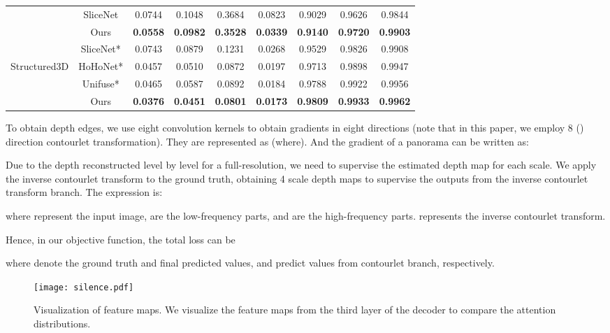 \documentclass[10pt,times,mathptm,psfig,twocolumn,journals]{IEEEtran}
\begin{document}
\begin{table*}[t]
\begin{center}
\begin{tabular}{ccccccccc}
&SliceNet\cite{Pintore_2021_CVPR}   & 0.0744  & 0.1048 & 0.3684 & 0.0823 & 0.9029 & 0.9626 & 0.9844    \\
&Ours   & \textbf{0.0558}  & \textbf{0.0982} & \textbf{0.3528} & \textbf{0.0339} & \textbf{0.9140} & \textbf{0.9720} & \textbf{0.9903}    \\
\hline
\noalign{\smallskip}
\hline
&SliceNet*\cite{Pintore_2021_CVPR}       & 0.0743  & 0.0879 & 0.1231 & 0.0268 & 0.9529 &0.9826 &0.9908     \\
Structured3D&HoHoNet*\cite{sun2021hohonet} & 0.0457  & 0.0510 & 0.0872 & 0.0197 & 0.9713 & 0.9898 & 0.9947\\
&Unifuse*\cite{Jiang_2021} & 0.0465  & 0.0587 & 0.0892 & 0.0184 & 0.9788 & 0.9922 & 0.9956      \\
&Ours   & \textbf{0.0376}  & \textbf{0.0451} & \textbf{0.0801} & \textbf{0.0173} & \textbf{0.9809} & \textbf{0.9933} & \textbf{0.9962}    \\
\hline
\end{tabular}
\end{center}
\end{table*}

To obtain depth edges, we use eight convolution kernels to obtain gradients in eight directions (note that in this paper, we employ 8 ()  direction contourlet transformation). They are represented as  (where). And the gradient of a panorama  can be written as:

Due to the depth reconstructed level by level for a full-resolution, we need to supervise the estimated depth map for each scale. We apply the inverse contourlet transform to the ground truth, obtaining 4 scale depth maps to supervise the outputs from the inverse contourlet transform branch. The expression is:



where  represent the input image,  are the low-frequency parts, and  are the high-frequency parts.  represents the inverse contourlet transform.


Hence, in our objective function, the total loss can be

where  denote the ground truth and final predicted values, and predict values from contourlet branch, respectively.
\begin{figure}[H]
\centering
\texttt{[image: silence.pdf]}
\caption{Visualization of feature maps. We visualize the feature maps from the third layer of the decoder to compare the attention distributions.}
\label{fig:silence}
\end{figure}
\end{document}
